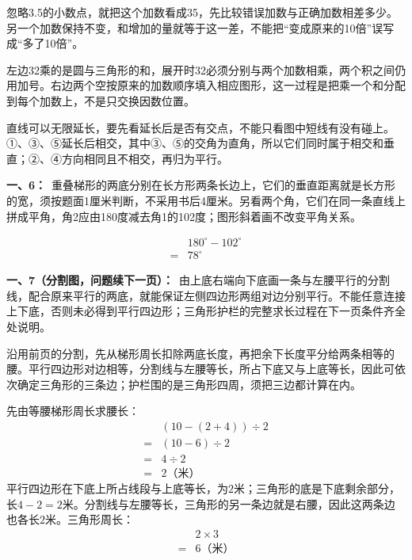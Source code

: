 \documentclass[multi=snippet,border=0pt]{standalone}
\newenvironment{snippet}[3]{\begin{minipage}{#1bp}\color{answerred}\fontsize{#2}{#3}\selectfont\raggedright}{\end{minipage}}
\begin{document}
\begin{snippet}{505}{11.5}{14}忽略3.5的小数点，就把这个加数看成35，先比较错误加数与正确加数相差多少。另一个加数保持不变，和增加的量就等于这一差，不能把“变成原来的10倍”误写成“多了10倍”。\end{snippet}
\begin{snippet}{505}{11.5}{14}左边32乘的是圆与三角形的和，展开时32必须分别与两个加数相乘，两个积之间仍用加号。右边两个空按原来的加数顺序填入相应图形，这一过程是把乘一个和分配到每个加数上，不是只交换因数位置。\end{snippet}
\begin{snippet}{505}{11.5}{14}直线可以无限延长，要先看延长后是否有交点，不能只看图中短线有没有碰上。①、③、⑤延长后相交，其中③、⑤的交角为直角，所以它们同时属于相交和垂直；②、④方向相同且不相交，再归为平行。\end{snippet}
\begin{snippet}{505}{11.5}{14}\textbf{一、6：}\ 重叠梯形的两底分别在长方形两条长边上，它们的垂直距离就是长方形的宽，须按题面1厘米判断，不采用书后4厘米。另看两个角，它们在同一条直线上拼成平角，角2应由180度减去角1的102度；图形斜着画不改变平角关系。\par \[\begin{aligned}&180^\circ-102^\circ\\={}&78^\circ\end{aligned}\]\end{snippet}
\begin{snippet}{505}{11.5}{14}\textbf{一、7（分割图，问题续下一页）：}\ 由上底右端向下底画一条与左腰平行的分割线，配合原来平行的两底，就能保证左侧四边形两组对边分别平行。不能任意连接上下底，否则未必得到平行四边形；三角形护栏的完整求长过程在下一页条件齐全处说明。\end{snippet}
\begin{snippet}{505}{11.5}{14}沿用前页的分割，先从梯形周长扣除两底长度，再把余下长度平分给两条相等的腰。平行四边形对边相等，分割线与左腰等长，所占下底又与上底等长，因此可依次确定三角形的三条边；护栏围的是三角形四周，须把三边都计算在内。\par 先由等腰梯形周长求腰长：\[\begin{aligned}&(10-(2+4))\div2\\={}&(10-6)\div2\\={}&4\div2\\={}&2\text{（米）}\end{aligned}\]平行四边形在下底上所占线段与上底等长，为\(2\)米；三角形的底是下底剩余部分，长\(4-2=2\)米。分割线与左腰等长，三角形的另一条边就是右腰，因此这两条边也各长\(2\)米。三角形周长：\[\begin{aligned}&2\times3\\={}&6\text{（米）}\end{aligned}\]\end{snippet}
\end{document}
